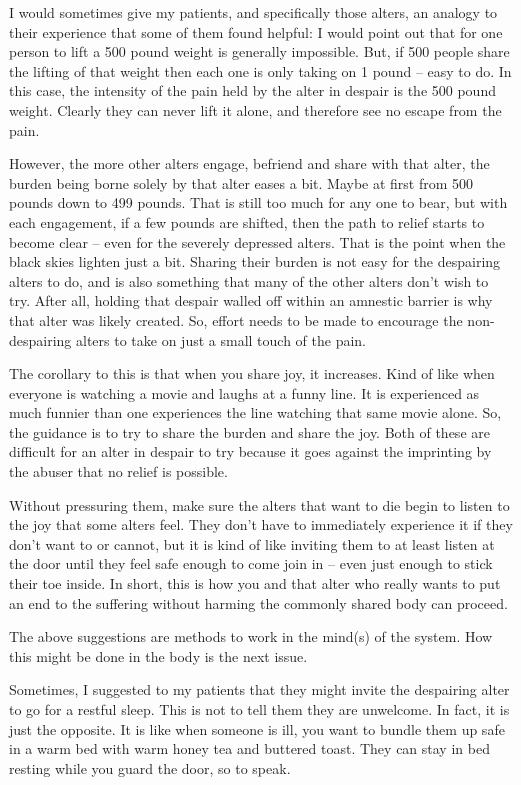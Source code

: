 \documentclass[]{book}
\begin{document}
I would sometimes give my patients, and specifically those alters, an analogy to their experience that some of them found helpful: I would point out that for one person to lift a 500 pound weight is generally impossible. But, if 500 people share the lifting of that weight then each one is only taking on 1 pound -- easy to do. In this case, the intensity of the pain held by the alter in despair is the 500 pound weight. Clearly they can never lift it alone, and therefore see no escape from the pain.

However, the more other alters engage, befriend and share with that alter, the burden being borne solely by that alter eases a bit. Maybe at first from 500 pounds down to 499 pounds. That is still too much for any one to bear, but with each engagement, if a few pounds are shifted, then the path to relief starts to become clear -- even for the severely depressed alters. That is the point when the black skies lighten just a bit. Sharing their burden is not easy for the despairing alters to do, and is also something that many of the other alters don't wish to try. After all, holding that despair walled off within an amnestic barrier is why that alter was likely created. So, effort needs to be made to encourage the non-despairing alters to take on just a small touch of the pain.

The corollary to this is that when you share joy, it increases. Kind of like when everyone is watching a movie and laughs at a funny line. It is experienced as much funnier than one experiences the line watching that same movie alone. So, the guidance is to try to share the burden and share the joy. Both of these are difficult for an alter in despair to try because it goes against the imprinting by the abuser that no relief is possible.

Without pressuring them, make sure the alters that want to die begin to listen to the joy that some alters feel. They don't have to immediately experience it if they don't want to or cannot, but it is kind of like inviting them to at least listen at the door until they feel safe enough to come join in -- even just enough to stick their toe inside. In short, this is how you and that alter who really wants to put an end to the suffering without harming the commonly shared body can proceed.

The above suggestions are methods to work in the mind(s) of the system. How this might be done in the body is the next issue.

Sometimes, I suggested to my patients that they might invite the despairing alter to go for a restful sleep. This is not to tell them they are unwelcome. In fact, it is just the opposite. It is like when someone is ill, you want to bundle them up safe in a warm bed with warm honey tea and buttered toast. They can stay in bed resting while you guard the door, so to speak.
\end{document}
